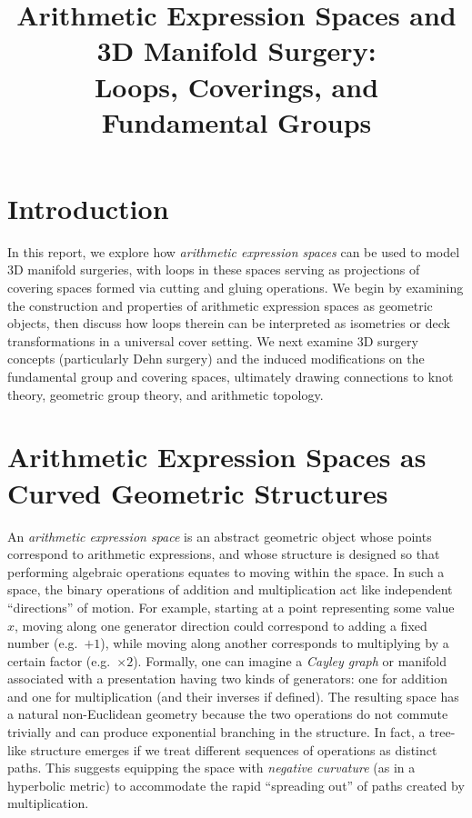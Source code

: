 \documentclass[11pt]{article}
\theoremstyle{remark}
\begin{document}
    \title{Arithmetic Expression Spaces and 3D Manifold Surgery:\\
    Loops, Coverings, and Fundamental Groups}
    \author{}
    \date{}

    \maketitle

    \section*{Introduction}

    In this report, we explore how \emph{arithmetic expression spaces} can be used to model 3D manifold surgeries, with loops in these spaces serving as projections of covering spaces formed via cutting and gluing operations. We begin by examining the construction and properties of arithmetic expression spaces as geometric objects, then discuss how loops therein can be interpreted as isometries or deck transformations in a universal cover setting. We next examine 3D surgery concepts (particularly Dehn surgery) and the induced modifications on the fundamental group and covering spaces, ultimately drawing connections to knot theory, geometric group theory, and arithmetic topology.

    \bigskip

    \section{Arithmetic Expression Spaces as Curved Geometric Structures}
    \label{sec:arithmetic-spaces}

    An \emph{arithmetic expression space} is an abstract geometric object whose points correspond to arithmetic expressions, and whose structure is designed so that performing algebraic operations equates to moving within the space. In such a space, the binary operations of addition and multiplication act like independent ``directions'' of motion. For example, starting at a point representing some value $x$, moving along one generator direction could correspond to adding a fixed number (e.g.\ $+1$), while moving along another corresponds to multiplying by a certain factor (e.g.\ $\times 2$). Formally, one can imagine a \emph{Cayley graph} or manifold associated with a presentation having two kinds of generators: one for addition and one for multiplication (and their inverses if defined). The resulting space has a natural non-Euclidean geometry because the two operations do not commute trivially and can produce exponential branching in the structure. In fact, a tree-like structure emerges if we treat different sequences of operations as distinct paths. This suggests equipping the space with \emph{negative curvature} (as in a hyperbolic metric) to accommodate the rapid ``spreading out'' of paths created by multiplication.
\end{document}
